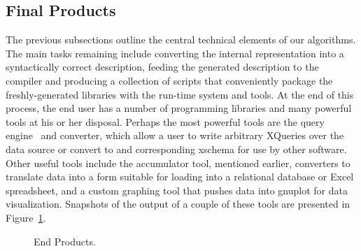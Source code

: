  

\subsection {Final Products}

The previous subsections outline the central technical elements of our
algorithms.  The main tasks remaining include converting the internal
representation into a syntactically correct \pads{} description, feeding
the generated description to the \pads{} compiler and producing a 
collection of scripts that conveniently package the freshly-generated 
libraries with the \pads{} run-time system and tools.  At the end of 
this process, the end user has a number of programming libraries
and many powerful tools at his or her disposal.
Perhaps the most powerful tools are the \padx{} query 
engine~\cite{fernandez+:padx} and \xml{} converter, which allow a 
user to write arbitrary XQueries over the data source
or convert to \xml{} and corresponding xschema for use by other software. Other
useful tools include the accumulator tool, mentioned earlier,
converters to translate data into a form suitable for
loading into a relational database or Excel spreadsheet, and
a custom graphing tool that pushes data into gnuplot for data visualization.
Snapshots of the output of a couple of these tools are presented in
Figure~\ref{fig:final-products}.  

\begin {figure}
\caption {End Products.}
\label{fig:final-products}
\end{figure}
